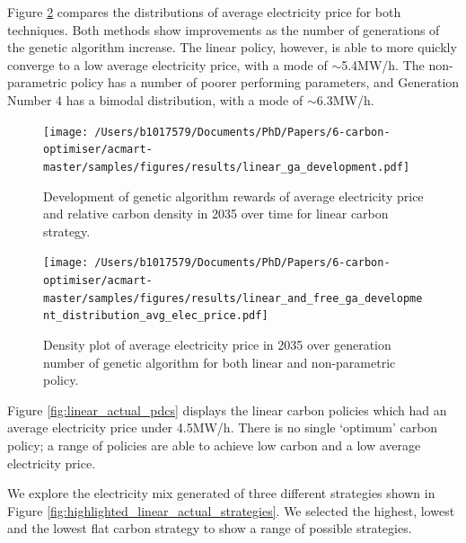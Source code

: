 \documentclass[sigconf]{acmart}
\begin{document}
Figure \ref{fig:comparison_of_distributions} compares the distributions of average electricity price for both techniques. Both methods show improvements as the number of generations of the genetic algorithm increase.  The linear policy, however, is able to more quickly converge to a low average electricity price, with a mode of ${\sim}$\textsterling5.4MW/h. The non-parametric policy has a number of poorer performing parameters, and Generation Number 4 has a bimodal distribution, with a mode of ${\sim}$\textsterling6.3MW/h.

\begin{figure}
\centering
\texttt{[image: /Users/b1017579/Documents/PhD/Papers/6-carbon-optimiser/acmart-master/samples/figures/results/linear\_ga\_development.pdf]}
\caption{Development of genetic algorithm rewards of average electricity price and relative carbon density in 2035 over time for linear carbon strategy.}
\label{fig:linear_ga_development}
\end{figure}





\begin{figure}
\centering
\texttt{[image: /Users/b1017579/Documents/PhD/Papers/6-carbon-optimiser/acmart-master/samples/figures/results/linear\_and\_free\_ga\_development\_distribution\_avg\_elec\_price.pdf]}
\caption{Density plot of average electricity price in 2035 over generation number of genetic algorithm for both linear and non-parametric policy.}
\label{fig:comparison_of_distributions}
\end{figure}

Figure \ref{fig:linear_actual_pdcs} displays the linear carbon policies which had an average electricity price under \textsterling4.5MW/h. There is no single `optimum' carbon policy; a range of policies are able to achieve low carbon and a low average electricity price.


We explore the electricity mix generated of three different strategies shown in Figure \ref{fig:highlighted_linear_actual_strategies}. We selected the highest, lowest and the lowest flat carbon strategy to show a range of possible strategies.
\end{document}
